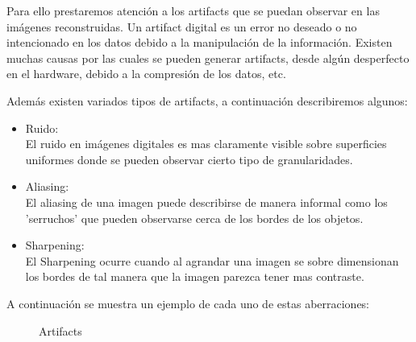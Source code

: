 Para ello prestaremos atención a los artifacts que se puedan observar en las imágenes reconstruidas. Un artifact digital es un error no deseado o no intencionado en los datos debido a la manipulación de la información. Existen muchas causas por las cuales se pueden generar artifacts, desde algún desperfecto en el hardware, debido a la compresión de los datos, etc.

Además existen variados tipos de artifacts, a continuación describiremos algunos:

\begin{itemize}
 \item Ruido:
 \\
 	El ruido en imágenes digitales es mas claramente visible sobre superficies uniformes donde se pueden observar cierto tipo de granularidades.
 \item Aliasing:
 \\
 	El aliasing de una imagen puede describirse de manera informal como los 'serruchos' que pueden observarse cerca de los bordes de los objetos.
 \item Sharpening:
 \\
 El Sharpening ocurre cuando al agrandar una imagen se sobre dimensionan los bordes de tal manera que la imagen parezca tener mas contraste.
\end{itemize}
A continuación se muestra un ejemplo de cada uno de estas aberraciones:
\begin{figure}[H]
\centering
{}
\qquad
{}
\qquad
{}
\caption{Artifacts}
\end{figure}

